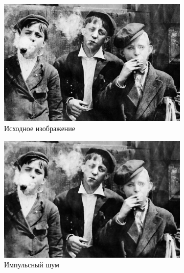 \begin{figure}[ht] 
    \centering
    \begin{subfigure}[b]{0.5\linewidth}
        \centering
        \includegraphics[width=0.95\linewidth]{../lewis-hine-taschen-main-3.jpg} 
        \caption{Исходное изображение} 
        \label{median_5:a} 
        \vspace{4ex}
    \end{subfigure}%
    \begin{subfigure}[b]{0.5\linewidth}
      \centering
      \includegraphics[width=0.95\linewidth]{../Median_FIlter/Median_Impulse_noise_(k=5).jpg} 
      \caption{Импульсный шум} 
      \label{median_5:b} 
      \vspace{4ex}
    \end{subfigure}
    \begin{subfigure}[b]{0.5\linewidth}
      \centering

\end{subfigure}
\end{figure}
